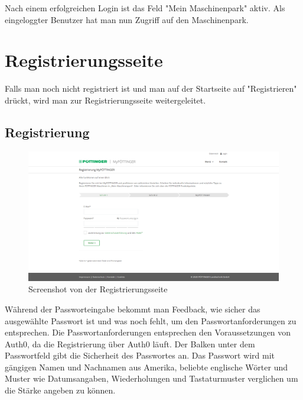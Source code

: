 Nach einem erfolgreichen Login ist das Feld "Mein Maschinenpark" aktiv. Als eingeloggter Benutzer hat man nun Zugriff auf den Maschinenpark. 

\section{Registrierungsseite}

Falls man noch nicht registriert ist und man auf der Startseite auf "Registrieren" drückt, wird man zur Registrierungsseite weitergeleitet.

\subsection{Registrierung}
\begin{figure}[H]
	\centerline{
		\includegraphics[width=1\textwidth]{./grafiken/erm_register.png}
	}
	\vskip0pt
	\caption{Screenshot von der Registrierungsseite} \label{fig:register}
\end{figure}

Während der Passworteingabe bekommt man Feedback, wie sicher das ausgewählte Passwort ist und was noch fehlt, um den Passwortanforderungen zu entsprechen. Die Passwortanforderungen entsprechen den Voraussetzungen von Auth0, da die Registrierung über Auth0 läuft. Der Balken unter dem Passwortfeld gibt die Sicherheit des Passwortes an. Das Passwort wird mit gängigen Namen und Nachnamen aus Amerika, beliebte englische Wörter und Muster wie Datumsangaben, Wiederholungen und Tastaturmuster verglichen um die Stärke angeben zu können.

